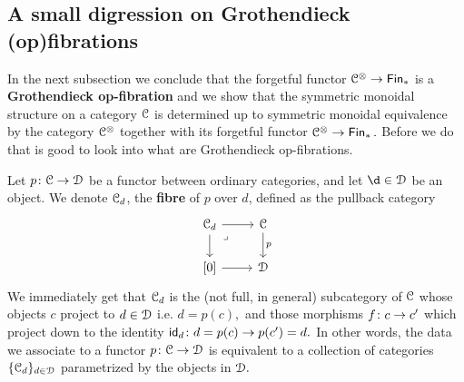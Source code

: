 \subsection{A small digression on Grothendieck (op)fibrations}
In the next subsection we conclude that the forgetful functor $\mathcal C^\otimes \rightarrow \operatorname{\sf Fin}_\ast$ is a \textbf{Grothendieck op-fibration} and we show that the symmetric monoidal structure on a category $\mathcal C$ is determined up to symmetric monoidal equivalence by the category $\mathcal C^\otimes$ together with its forgetful functor $\mathcal C^\otimes \rightarrow \operatorname{\sf Fin}_\ast.$ Before we do that is good to look into what are Grothendieck op-fibrations.

Let $p\colon \mathcal C\rightarrow \mathcal D$ be a functor between ordinary categories, and let $\d\in\cD$ be an object. We denote $\mathcal C_d$, the \textbf{fibre} of $p$ over $d$, defined as the pullback category 
\[\begin{tikzcd}
	{\cC_d} & \cC \\
	{[0]} & \cD
	\arrow[from=2-1, to=2-2]
	\arrow[from=1-1, to=1-2]
	\arrow["p", from=1-2, to=2-2]
	\arrow[from=1-1, to=2-1]
	\arrow["\lrcorner"{anchor=center, pos=0.125}, draw=none, from=1-1, to=2-2]
\end{tikzcd}\]
We immediately get that $\mathcal C_d$ is the (not full, in general) subcategory of $\mathcal C$ whose objects $c$ project to $d\in\mathcal D$ i.e. $d=p(c),$ and those morphisms $f\colon c \rightarrow c'$ which project down to the identity $\operatorname{{\sf id}}_d \colon d =p(c) \rightarrow p(c')=d.$ In other words, the data we associate to a functor $p\colon \mathcal C\rightarrow \mathcal D$ is equivalent to a collection of categories $\{\mathcal C_d\}_{d\in\mathcal D}$ parametrized by the objects in $\mathcal D.$

